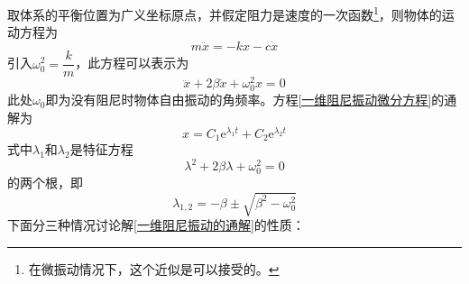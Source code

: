 取体系的平衡位置为广义坐标原点，并假定阻力是速度的一次函数\footnote{在微振动情况下，这个近似是可以接受的。}，则物体的运动方程为
\begin{equation*}
	m\ddot{x} = -kx - c\dot{x}
\end{equation*}
引入$\omega_0^2 = \dfrac{k}{m}$，此方程可以表示为
\begin{equation}
	\ddot{x} + 2\beta \dot{x} + \omega_0^2 x = 0
	\label{一维阻尼振动微分方程}
\end{equation}
此处$\omega_0$即为没有阻尼时物体自由振动的角频率。方程\eqref{一维阻尼振动微分方程}的通解为
\begin{equation}
	x = C_1 \mathrm{e}^{\lambda_1 t} + C_2 \mathrm{e}^{\lambda_2 t}
	\label{一维阻尼振动的通解}
\end{equation}
式中$\lambda_1$和$\lambda_2$是特征方程
\begin{equation*}
	\lambda^2 + 2\beta \lambda + \omega_0^2 = 0
\end{equation*}
的两个根，即
\begin{equation}
	\lambda_{1,2} = -\beta \pm \sqrt{\beta^2-\omega_0^2}
\end{equation}
下面分三种情况讨论解\eqref{一维阻尼振动的通解}的性质：
